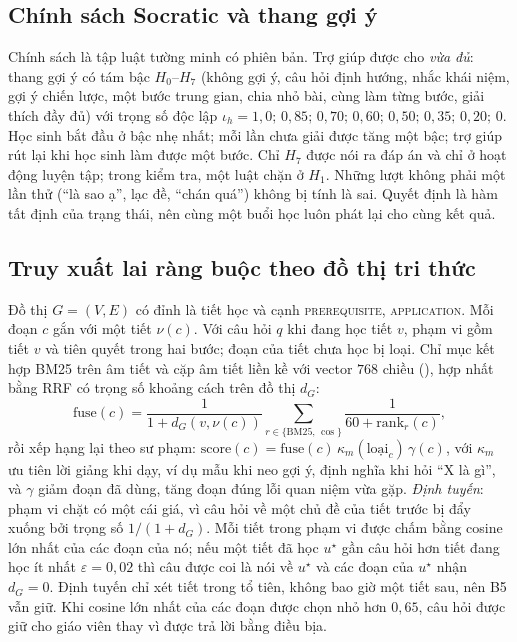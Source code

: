 \documentclass[10pt,a4paper,twocolumn]{article}
\begin{document}
\subsection{Chính sách Socratic và thang gợi ý}
Chính sách là tập luật tường minh có phiên bản. Trợ giúp được cho \emph{vừa đủ}: thang gợi ý có tám bậc $H_0$--$H_7$ (không gợi ý, câu hỏi định hướng, nhắc khái niệm, gợi ý chiến lược, một bước trung gian, chia nhỏ bài, cùng làm từng bước, giải thích đầy đủ) với trọng số độc lập $\iota_h=1{,}0;\,0{,}85;\,0{,}70;\,0{,}60;\,0{,}50;\,0{,}35;\,0{,}20;\,0$. Học sinh bắt đầu ở bậc nhẹ nhất; mỗi lần chưa giải được tăng một bậc; trợ giúp rút lại khi học sinh làm được một bước. Chỉ $H_7$ được nói ra đáp án và chỉ ở hoạt động luyện tập; trong kiểm tra, một luật chặn ở $H_1$. Những lượt không phải một lần thử (``là sao ạ'', lạc đề, ``chán quá'') không bị tính là sai. Quyết định là hàm tất định của trạng thái, nên cùng một buổi học luôn phát lại cho cùng kết quả.

\subsection{Truy xuất lai ràng buộc theo đồ thị tri thức}
Đồ thị $G=(V,E)$ có đỉnh là tiết học và cạnh \textsc{prerequisite}, \textsc{application}. Mỗi đoạn $c$ gắn với một tiết $\nu(c)$. Với câu hỏi $q$ khi đang học tiết $v$, phạm vi gồm tiết $v$ và tiên quyết trong hai bước; đoạn của tiết chưa học bị loại. Chỉ mục kết hợp BM25 trên âm tiết và cặp âm tiết liền kề với vector $768$ chiều (), hợp nhất bằng RRF có trọng số khoảng cách trên đồ thị $d_G$:
\begin{equation}
\mathrm{fuse}(c)=\frac{1}{1+d_G(v,\nu(c))}\sum_{r\in\{\mathrm{BM25},\,\cos\}}\frac{1}{60+\mathrm{rank}_r(c)},
\label{eq:fuse}
\end{equation}
rồi xếp hạng lại theo sư phạm: $\mathrm{score}(c)=\mathrm{fuse}(c)\,\kappa_{m}(\text{loại}_c)\,\gamma(c)$, với $\kappa_m$ ưu tiên lời giảng khi dạy, ví dụ mẫu khi neo gợi ý, định nghĩa khi hỏi ``X là gì'', và $\gamma$ giảm đoạn đã dùng, tăng đoạn đúng lỗi quan niệm vừa gặp. \emph{Định tuyến}: phạm vi chặt có một cái giá, vì câu hỏi về một chủ đề của tiết trước bị đẩy xuống bởi trọng số $1/(1+d_G)$. Mỗi tiết trong phạm vi được chấm bằng cosine lớn nhất của các đoạn của nó; nếu một tiết đã học $u^\star$ gần câu hỏi hơn tiết đang học ít nhất $\varepsilon=0{,}02$ thì câu được coi là nói về $u^\star$ và các đoạn của $u^\star$ nhận $d_G=0$. Định tuyến chỉ xét tiết trong tổ tiên, không bao giờ một tiết sau, nên B5 vẫn giữ. Khi cosine lớn nhất của các đoạn được chọn nhỏ hơn $0{,}65$, câu hỏi được giữ cho giáo viên thay vì được trả lời bằng điều bịa.
\end{document}
